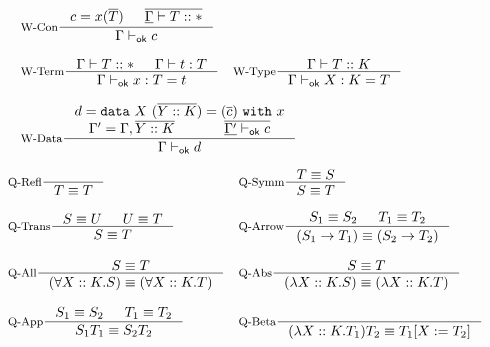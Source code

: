 \newcommand{\provesok}{|-_{\textsf{ok}}}
\begin{figure}[!t]
  \centering
  \begin{displaymath}
  \begin{array}{ll}
  \inference[W-Con]{c = x(\seq{T}) & \seq{\fixed{\Gamma} |- T::\Type}}{\Gamma \provesok c} \\
  \\
  \inference[W-Term]{
    \Gamma |- T :: \Type & 
    \Gamma |- t : T}{\Gamma \provesok x : T = t} &
  \inference[W-Type]{\Gamma |- T :: K}{\Gamma \provesok X : K = T}\\
  \\
  \multicolumn{2}{l}{\inference[W-Data]{
    d=\datatype{X}{(\seq{Y :: K})}{x}{(\seq{c})} \\
    \Gamma^\prime = \Gamma, \seq{Y::K} &
    \seq{\fixed{\Gamma^\prime} \provesok c}}{\Gamma \provesok d}}\\
  \end{array}
  \end{displaymath}
  \label{fig:fir_wellformed}
\end{figure}

\begin{figure}[!t]
  \centering
  \begin{displaymath}
  \begin{array}{ll}
  \inference[Q-Refl]{}{T \equiv T} &
  \inference[Q-Symm]{T \equiv S}{S \equiv T}  \\
  \\
  \inference[Q-Trans]{S \equiv U & U \equiv T}{S \equiv T} &
  \inference[Q-Arrow]{S_1 \equiv S_2 & T_1 \equiv T_2}{(S_1 -> T_1) \equiv (S_2 -> T_2)} \\
  \\
  \inference[Q-All]{S \equiv T}{(\forall X::K.S) \equiv (\forall X::K.T)} &
  \inference[Q-Abs]{S \equiv T}{(\lambda X::K.S) \equiv (\lambda X::K.T)} \\
  \\
  \inference[Q-App]{S_1 \equiv S_2 & T_1 \equiv T_2}{S_1 T_1 \equiv S_2 T_2} &
  \inference[Q-Beta]{}{(\lambda X::K.T_1)T_2 \equiv \substIn{X}{T_2}{T_1}}
  \end{array}
  \end{displaymath}
  \label{fig:fir_typeq}
\end{figure}

